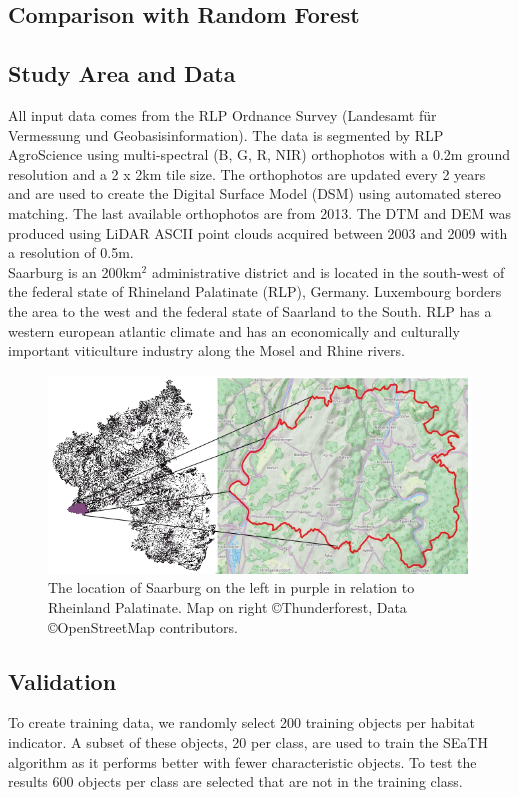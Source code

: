 \documentclass[authoryear, review,12pt,number]{elsarticle}
\begin{document}
\subsection{Comparison with Random Forest}

\subsection{Study Area and Data}
All input data comes from the RLP Ordnance Survey (Landesamt f\"ur Vermessung
und Geobasisinformation). The data is segmented by RLP AgroScience using
multi-spectral (B, G, R, NIR) orthophotos with a 0.2m ground resolution and a 2
x 2km tile size. The orthophotos are updated every 2 years and are used to
create the Digital Surface Model (DSM) using automated stereo matching. The
last available orthophotos are from 2013. The DTM and DEM was produced using
LiDAR ASCII point clouds acquired between 2003 and 2009 with a resolution of
0.5m.\\
Saarburg is an 200km$^{2}$ administrative district and is located in the
south-west of the federal state of Rhineland Palatinate (RLP), Germany.
Luxembourg borders the area to the west and the federal state of Saarland to
the South.  RLP has a western european atlantic climate and has an economically
and culturally important viticulture industry along the Mosel and Rhine rivers.
\begin{figure}
    \includegraphics[width=\textwidth]{diagrams/study_area_closeup.png}
    \caption{The location of Saarburg on the left in purple in relation to
    Rheinland Palatinate. Map on right \copyright Thunderforest, Data
\copyright OpenStreetMap contributors.} \end{figure}

\subsection{Validation} To create training data, we randomly select 200
training objects per habitat indicator. A subset of these objects, 20 per
class, are used to train the SEaTH algorithm as it performs better with fewer
characteristic objects. To test the results 600 objects per class are selected
that are not in the training class.
\end{document}
